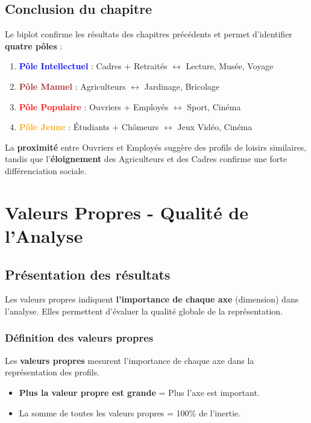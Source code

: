 \documentclass[12pt,a4paper]{book}
\begin{document}
	\section{Conclusion du chapitre}
	
	Le biplot confirme les résultats des chapitres précédents et permet d'identifier \textbf{quatre pôles} :
	
	\begin{enumerate}
		\item \textcolor{blue}{\textbf{Pôle Intellectuel}} : Cadres + Retraités $\leftrightarrow$ Lecture, Musée, Voyage
		\item \textcolor{brown}{\textbf{Pôle Manuel}} : Agriculteurs $\leftrightarrow$ Jardinage, Bricolage
		\item \textcolor{red}{\textbf{Pôle Populaire}} : Ouvriers + Employés $\leftrightarrow$ Sport, Cinéma
		\item \textcolor{orange}{\textbf{Pôle Jeune}} : Étudiants + Chômeurs $\leftrightarrow$ Jeux Vidéo, Cinéma
	\end{enumerate}
	
	La \textbf{proximité} entre Ouvriers et Employés suggère des profils de loisirs similaires, tandis que l'\textbf{éloignement} des Agriculteurs et des Cadres confirme une forte différenciation sociale.
	
	\chapter{Valeurs Propres - Qualité de l'Analyse}
	
	\section{Présentation des résultats}
	
	Les valeurs propres indiquent \textbf{l'importance de chaque axe} (dimension) dans l'analyse. Elles permettent d'évaluer la qualité globale de la représentation.
	
	\subsection{Définition des valeurs propres}
	
	Les \textbf{valeurs propres} mesurent l'importance de chaque axe dans la représentation des profils.
	
	\begin{itemize}
		\item \textbf{Plus la valeur propre est grande} = Plus l'axe est important.
		\item La somme de toutes les valeurs propres = 100\% de l'inertie.
	\end{itemize}
	
\end{document}
